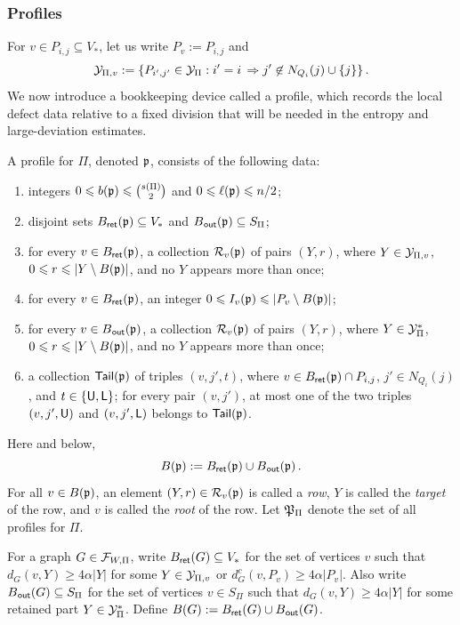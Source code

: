 \subsubsection{Profiles}\label{subsec:subcritical-profiles-K1k}
For $v\in P_{i,j}\subseteq V_\ast$, let us write $P_v:=P_{i,j}$ and
$${\mathcal Y}_{\Pi,v}:=\{P_{i',j'}\in{\mathcal Y}_\Pi:i'=i\,\Rightarrow j'\not\in N_{Q_i}(j)\cup\{j\}\}\,.$$
We now introduce a bookkeeping device called a profile, which records the local defect data relative to a fixed division that will be needed in the entropy and large-deviation estimates.

\begin{definition}[Profile]\label{def:profile-datum-K1k}
A profile for $\Pi$, denoted ${\mathfrak p}$, consists of the following data:
\begin{enumerate}[label=\textit{(\roman*)}, ref=(\textit{\roman*}), topsep=5pt]
  \item integers $0\leqslant b({\mathfrak p})\leqslant\binom{s(\Pi)}{2}$ and $0\leqslant\ell({\mathfrak p})\leqslant n/2$;
  \item disjoint sets $B_{\mathsf{ret}}({\mathfrak p})\subseteq V_\ast$ and $B_{\hspace{0.2mm}\mathsf{out}}({\mathfrak p})\subseteq S_\Pi$;
  \item for every $v\in B_{\mathsf{ret}}({\mathfrak p})$, a collection ${\mathcal R}_v({\mathfrak p})$ of pairs $(Y,r)$, where $Y\in{\mathcal Y}_{\Pi,v}$, $0\leqslant r\leqslant |Y\setminus B({\mathfrak p})|$, and no $Y$ appears more than once;
  \item for every $v\in B_{\mathsf{ret}}({\mathfrak p})$, an integer $0\leqslant I_v({\mathfrak p})\leqslant |P_v\setminus B({\mathfrak p})|$;
  \item for every $v\in B_{\hspace{0.2mm}\mathsf{out}}({\mathfrak p})$, a collection ${\mathcal R}_v({\mathfrak p})$ of pairs $(Y,r)$, where $Y\in{\mathcal Y}^\ast_\Pi$, $0\leqslant r\leqslant |Y\setminus B({\mathfrak p})|$, and no $Y$ appears more than once;
  \item a collection ${\mathsf{Tail}}({\mathfrak p})$ of triples $(v,j',t)$, where $v\in B_{\mathsf{ret}}({\mathfrak p})\cap P_{i,j}$, $j'\in N_{Q_i}(j)$, and $t\in\{{\mathsf{U}},{\mathsf{L}}\}$; for every pair $(v,j')$, at most one of the two triples $(v,j',{\mathsf{U}})$ and $(v,j',{\mathsf{L}})$ belongs to ${\mathsf{Tail}}({\mathfrak p})$.
\end{enumerate}
Here and below,
$$B({\mathfrak p}):=B_{\mathsf{ret}}({\mathfrak p})\cup B_{\hspace{0.2mm}\mathsf{out}}({\mathfrak p})\,.$$
For all $v\in B({\mathfrak p})$, an element $(Y,r)\in{\mathcal R}_v({\mathfrak p})$ is called a \emph{row}, $Y$ is called the \emph{target} of the row, and $v$ is called the \emph{root} of the row. Let ${\mathfrak P}_\Pi$ denote the set of all profiles for $\Pi$.
\end{definition}

For a graph $G\in{\mathcal F}_{W,\Pi}$, write $B_{\mathsf{ret}}(G)\subseteq V_\ast$ for the set of vertices $v$ such that $d_G(v,Y)\geq4\alpha|Y|$ for some $Y\in{\mathcal Y}_{\Pi,v}$ or $d_G^c(v,P_v)\geq4\alpha|P_v|$. Also write $B_{\hspace{0.2mm}\mathsf{out}}(G)\subseteq S_\Pi$ for the set of vertices $v\in S_\Pi$ such that $d_G(v,Y)\geq4\alpha|Y|$ for some retained part $Y\in{\mathcal Y}^\ast_\Pi$. Define $B(G):=B_{\mathsf{ret}}(G)\cup B_{\hspace{0.2mm}\mathsf{out}}(G)$.

